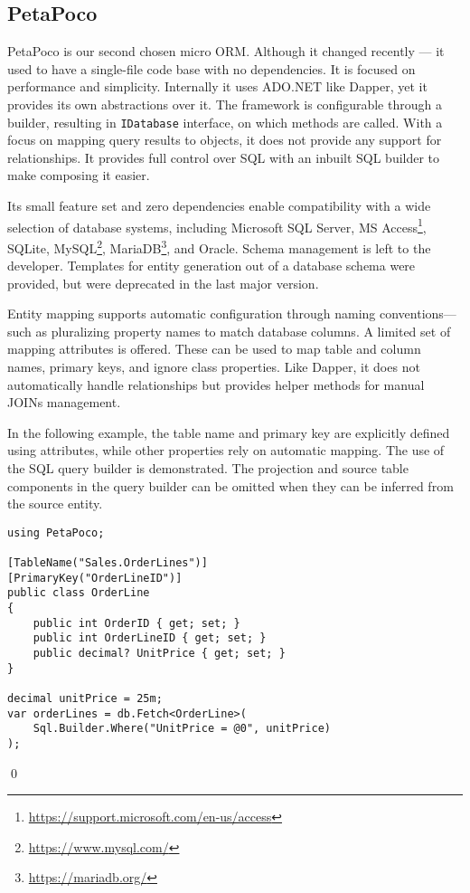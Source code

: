 \subsection{PetaPoco}\label{sec:feat_petapoco}

PetaPoco\cite{PetaPoco} is our second chosen micro ORM. Although it changed recently --- it used to have a single-file code base with no dependencies. It is focused on performance and simplicity. Internally it uses ADO.NET like Dapper, yet it provides its own abstractions over it. The framework is configurable through a builder, resulting in \texttt{IDatabase} interface, on which methods are called. With a focus on mapping query results to objects, it does not provide any support for relationships. It provides full control over SQL with an inbuilt SQL builder to make composing it easier. 

Its small feature set and zero dependencies enable compatibility with a wide selection of database systems, including Microsoft SQL Server, MS Access\footnote{\url{https://support.microsoft.com/en-us/access}}, SQLite, MySQL\footnote{\url{https://www.mysql.com/}}, MariaDB\footnote{\url{https://mariadb.org/}}, and Oracle. Schema management is left to the developer. Templates for entity generation out of a database schema were provided, but were deprecated in the last major version.

Entity mapping supports automatic configuration through naming conventions---such as pluralizing property names to match database columns. A limited set of mapping attributes is offered. These can be used to map table and column names, primary keys, and ignore class properties. Like Dapper, it does not automatically handle relationships but provides helper methods for manual JOINs management.

\begin{example}
\small
In the following example, the table name and primary key are explicitly defined using attributes, while other properties rely on automatic mapping. The use of the SQL query builder is demonstrated. The projection and source table components in the query builder can be omitted when they can be inferred from the source entity.

\begin{lstlisting}[language=CSharp]
using PetaPoco;

[TableName("Sales.OrderLines")]
[PrimaryKey("OrderLineID")]
public class OrderLine
{
    public int OrderID { get; set; }
    public int OrderLineID { get; set; }
    public decimal? UnitPrice { get; set; }
}

decimal unitPrice = 25m;
var orderLines = db.Fetch<OrderLine>(
    Sql.Builder.Where("UnitPrice = @0", unitPrice)
);
\end{lstlisting}
\qed
\end{example}

